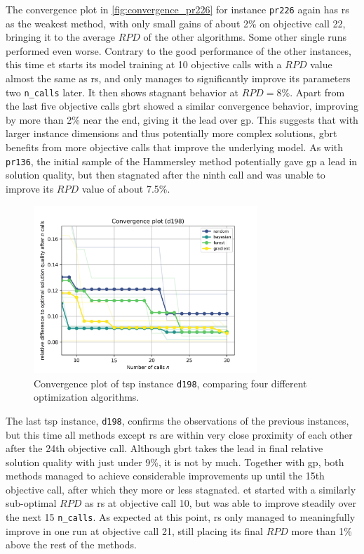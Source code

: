 The convergence plot in \cref{fig:convergence_pr226} for instance \texttt{pr226} again has \gls{rs} as the weakest method, with only small gains of about 2\% on objective call 22, bringing it to the average $RPD$ of the other algorithms. Some other single runs performed even worse. Contrary to the good performance of the other instances, this time \gls{et} starts its model training at 10 objective calls with a $RPD$ value almost the same as \gls{rs}, and only manages to significantly improve its parameters two \texttt{n\_calls} later. It then shows stagnant behavior at $RPD = 8\%$. Apart from the last five objective calls \gls{gbrt} showed a similar convergence behavior, improving by more than 2\% near the end, giving it the lead over \gls{gp}. This suggests that with larger instance dimensions and thus potentially more complex solutions, \gls{gbrt} benefits from more objective calls that improve the underlying model.
As with \texttt{pr136}, the initial sample of the Hammersley method potentially gave \gls{gp} a lead in solution quality, but then stagnated after the ninth call and was unable to improve its $RPD$ value of about 7.5\%.

\begin{figure}[h]
	\centering
	\includegraphics[width=0.75\textwidth]{results/part1/convergence_d198.png}
	\caption[Convergence plot of \gls{tsp} instance \texttt{d198}]{Convergence plot of \gls{tsp} instance \texttt{d198}, comparing four different optimization algorithms.}
	\label{fig:convergence_d198}
\end{figure}

The last \gls{tsp} instance, \texttt{d198}, confirms the observations of the previous instances, but this time all methods except \gls{rs} are within very close proximity of each other after the 24th objective call. Although \gls{gbrt} takes the lead in final relative solution quality with just under 9\%, it is not by much. Together with \gls{gp}, both methods managed to achieve considerable improvements up until the 15th objective call, after which they more or less stagnated. \gls{et} started with a similarly sub-optimal $RPD$ as \gls{rs} at objective call 10, but was able to improve steadily over the next 15 \texttt{n\_calls}. As expected at this point, \gls{rs} only managed to meaningfully improve in one run at objective call 21, still placing its final $RPD$ more than 1\% above the rest of the methods.

